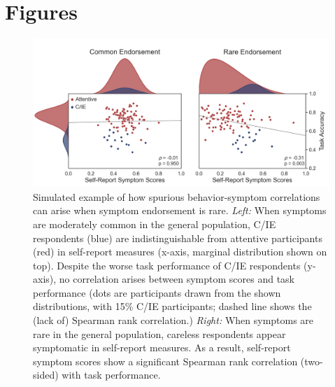 \documentclass[a4paper,notitlepage,12pt]{article}
\begin{document}
\clearpage
\section*{Figures}

\begin{figure}[h]
    \includegraphics[width=16cm]{../figures/main_01.png}
    \centering
    \caption{Simulated example of how spurious behavior-symptom correlations can arise when symptom endorsement is rare. \textit{Left:} When symptoms are moderately common in the general population, C/IE respondents (blue) are indistinguishable from attentive participants (red) in self-report measures (x-axis, marginal distribution shown on top). Despite the worse task performance of C/IE respondents (y-axis), no correlation arises between symptom scores and task performance (dots are participants drawn from the shown distributions, with 15\% C/IE participants; dashed line shows the (lack of) Spearman rank correlation.) \textit{Right:} When symptoms are rare in the general population, careless respondents appear symptomatic in self-report measures. As a result, self-report symptom scores show a significant Spearman rank correlation (two-sided) with task performance.}
    \label{fig:simulation}
\end{figure}
\end{document}

